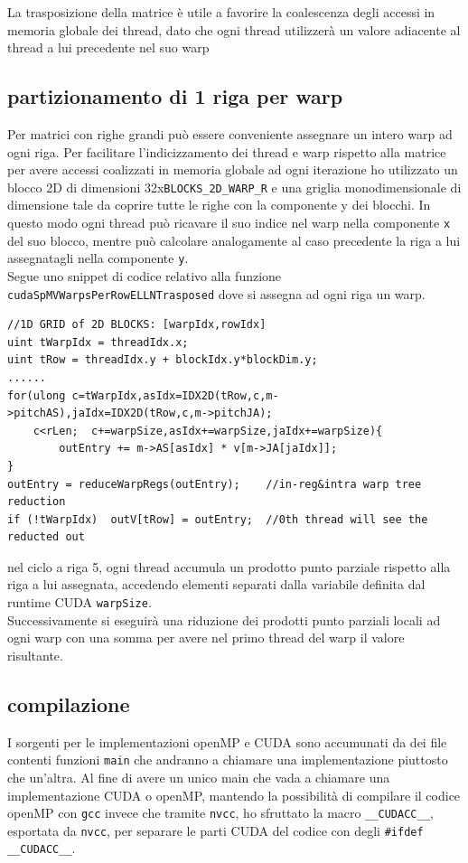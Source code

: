 \documentclass[acmsmall,nonacm=true]{acmart}
\newcommand{\vvv}[1]{{\small\texttt{#1}}}
\begin{document}
La trasposizione della matrice è utile a favorire la coalescenza degli accessi 
in memoria globale dei thread, dato che ogni thread utilizzerà un valore adiacente 
al thread a lui precedente nel suo warp
\subsection{partizionamento di 1 riga per warp} \label{cudaSpMVWarpsPerRowELLNTrasposed}
Per matrici con righe grandi %
può essere conveniente assegnare un intero warp ad ogni riga.
Per facilitare l'indicizzamento dei thread e warp rispetto alla matrice
per avere accessi coalizzati in memoria globale ad ogni iterazione ho utilizzato
un blocco 2D di dimensioni 32x\vvv{BLOCKS\_2D\_WARP\_R} e una griglia monodimensionale
di dimensione tale da coprire tutte le righe con la componente y dei blocchi.
In questo modo ogni thread può ricavare il suo indice nel warp nella componente
\vvv{x} del suo blocco, mentre può calcolare analogamente al caso precedente la riga
a lui assegnatagli nella componente \vvv{y}.\\
Segue uno snippet di codice relativo alla funzione \vvv{cudaSpMVWarpsPerRowELLNTrasposed}
dove si assegna ad ogni riga un warp.
\begin{lstlisting}
//1D GRID of 2D BLOCKS: [warpIdx,rowIdx]
uint tWarpIdx = threadIdx.x;
uint tRow = threadIdx.y + blockIdx.y*blockDim.y;
......
for(ulong c=tWarpIdx,asIdx=IDX2D(tRow,c,m->pitchAS),jaIdx=IDX2D(tRow,c,m->pitchJA);     
    c<rLen;  c+=warpSize,asIdx+=warpSize,jaIdx+=warpSize){                     
        outEntry += m->AS[asIdx] * v[m->JA[jaIdx]];                            
}       
outEntry = reduceWarpRegs(outEntry);    //in-reg&intra warp tree reduction     
if (!tWarpIdx)  outV[tRow] = outEntry;  //0th thread will see the reducted out 
\end{lstlisting}
nel ciclo a riga 5, ogni thread accumula un prodotto punto parziale rispetto alla 
riga a lui assegnata, accedendo elementi separati dalla variabile definita dal 
runtime CUDA \vvv{warpSize}.\\
Successivamente si eseguirà una riduzione dei prodotti punto parziali 
locali ad ogni warp con una somma 
per avere nel primo thread del warp il valore risultante.
\subsection{compilazione}
I sorgenti per le implementazioni openMP e CUDA sono accumunati da dei file 
contenti funzioni \vvv{main} che andranno a chiamare una implementazione
piuttosto che un'altra.
Al fine di avere un unico main che vada a chiamare una implementazione CUDA o 
openMP, mantendo la possibilità di compilare il codice openMP con \vvv{gcc}
invece che tramite \vvv{nvcc},
ho sfruttato la macro \vvv{\_\_CUDACC\_\_}, esportata da \vvv{nvcc},
 per separare le parti CUDA del codice con degli \vvv{\#ifdef \_\_CUDACC\_\_}.
\end{document}
